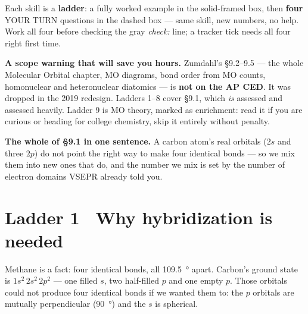 \documentclass{apchem-worksheet}
\begin{document}
\apctitleblock

\begin{apcnote}
Each skill is a \textbf{ladder}: a fully worked example in the
solid-framed box, then \textbf{four} YOUR TURN questions in the dashed
box --- same skill, new numbers, no help. Work all four before checking
the gray \emph{check:} line; a tracker tick needs all four right first
time.

\textbf{A scope warning that will save you hours.} Zumdahl's
\S9.2--9.5 --- the whole Molecular Orbital chapter, MO diagrams,
bond order from MO counts, homonuclear and heteronuclear diatomics ---
is \textbf{not on the AP CED}. It was dropped in the 2019 redesign.
Ladders 1--8 cover \S9.1, which \emph{is} assessed and assessed heavily.
Ladder 9 is MO theory, marked as enrichment: read it if you are curious
or heading for college chemistry, skip it entirely without penalty.

\textbf{The whole of \S9.1 in one sentence.} A carbon atom's real
orbitals ($2s$ and three $2p$) do not point the right way to make four
identical bonds --- so we mix them into new ones that do, and the number
we mix is set by the number of electron domains VSEPR already told you.
\end{apcnote}

\section*{\sffamily Ladder 1 \textbullet\ Why hybridization is needed}

Methane is a fact: four identical  bonds, all
\SI{109.5}{\degree} apart. Carbon's ground state is
$1s^{2}\,2s^{2}\,2p^{2}$ --- one filled $s$, two half-filled $p$ and one
empty $p$. Those orbitals could not produce four identical bonds if we
wanted them to: the $p$ orbitals are mutually perpendicular
(\SI{90}{\degree}) and the $s$ is spherical.
\end{document}
